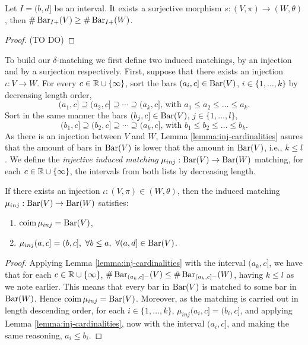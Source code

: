 \begin{lemma} \label{lemma:sur-cardinalities} %
    Let $ I = (b, d] $ be an interval. It exists a surjective morphism $s: (V, \pi) \to (W, \theta) $, then $\# \operatorname{Bar}_{I+}(V) \geq \# \operatorname{Bar}_{I+}(W) $.
\end{lemma}
\begin{proof}
    (TO DO)
\end{proof}

To build our $\delta$-matching we first define two induced matchings, by an injection and by a surjection respectively. First, suppose that there exists an injection $\iota : V \to W$. For every $ c \in \mathbb R \cup \{\infty\}$, sort the bars $(a_i, c] \in \operatorname{Bar}(V) $, $i \in \{1, \dots, k\} $ by decreasing length order,
$$
    (a_1, c] \supseteq (a_2, c] \supseteq \cdots \supseteq (a_k, c] \text{, with } a_1 \leq a_2 \leq \dots \leq a_k.
$$
Sort in the same manner the bars $(b_j, c] \in \operatorname{Bar}(V) $, $j \in \{1, \dots, l\} $,
$$
    (b_1, c] \supseteq (b_2, c] \supseteq \cdots \supseteq (a_k, c] \text{, with } b_1 \leq b_2 \leq \dots \leq b_k.
$$
As there is an injection between $ V $ and $ W$, Lemma \ref{lemma:inj-cardinalities} asures that the amount of bars in $ \operatorname{Bar}(V) $ is lower that the amount in $ \operatorname{Bar}(V) $, i.e., $ k \leq l $. We define the {\it injective induced matching} $\mu_{inj}: \operatorname{Bar}(V) \to \operatorname{Bar}(W) $ matching, for each $ c \in \mathbb R \cup \{\infty\} $, the intervals from both lists by decreasing length.

\begin{lemma} \label{lemma:inj-matching} %
    If there exists an injection $\iota: (V, \pi) \in (W, \theta) $, then the induced matching $ \mu_{inj}: \operatorname{Bar}(V) \to \operatorname{Bar} (W) $ satisfies:
    \begin{enumerate}
        \item $\operatorname{coim} \mu_{inj} = \operatorname{Bar}(V)$, \label{prop:3.1.5. 1}
        \item $\mu_{inj}(a, c] = (b, c], \ \forall b \leq a, \ \forall (a, d] \in \operatorname{Bar}(V)$.
    \end{enumerate}
\end{lemma}
\begin{proof}
    Applying Lemma \ref{lemma:inj-cardinalities} with the interval $ (a_k, c] $, we have that for each $ c \in \mathbb R \cup \{\infty\} $, $ \# \operatorname{Bar}_{(a_k, c]-}(V) \leq \# \operatorname{Bar}_{(a_k, c]-}(W) $, having $ k \leq l $ as we note earlier. This means that every bar in $\operatorname{Bar}(V)$ is matched to some bar in $\operatorname{Bar}(W)$. Hence $\operatorname{coim} \mu_{inj} = \operatorname{Bar}(V)$. Moreover, as the matching is carried out in length descending order, for each $ i \in \{1, \dots, k\} $, $\mu_{inj}(a_i, c] = (b_i, c]$, and applying Lemma \ref{lemma:inj-cardinalities}, now with the interval $ (a_i, c] $, and making the same reasoning, $ a_i \leq b_i $.
\end{proof}

